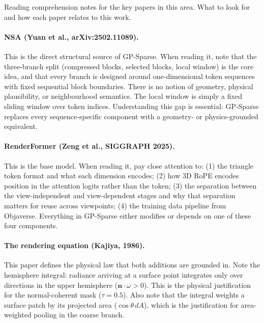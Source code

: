 \documentclass[11pt,letterpaper]{article}
\begin{document}
\begin{mdframed}[linecolor=black!30, backgroundcolor=gray!5]
Reading comprehension notes for the key papers in this area.
What to look for and how each paper relates to this work.
\end{mdframed}

\paragraph{NSA (Yuan et al., arXiv:2502.11089).}
This is the direct structural source of GP-Sparse.
When reading it, note that the three-branch split (compressed blocks,
selected blocks, local window) is the core idea, and that every branch
is designed around one-dimensional token sequences with fixed sequential
block boundaries.
There is no notion of geometry, physical plausibility, or neighbourhood
semantics.
The local window is simply a fixed sliding window over token indices.
Understanding this gap is essential: GP-Sparse replaces every
sequence-specific component with a geometry- or physics-grounded
equivalent.

\paragraph{RenderFormer (Zeng et al., SIGGRAPH 2025).}
This is the base model.
When reading it, pay close attention to: (1) the triangle token format
and what each dimension encodes; (2) how 3D RoPE encodes position in
the attention logits rather than the token; (3) the separation between
the view-independent and view-dependent stages and why that separation
matters for reuse across viewpoints; (4) the training data pipeline
from Objaverse.
Everything in GP-Sparse either modifies or depends on one of these four
components.

\paragraph{The rendering equation (Kajiya, 1986).}
This paper defines the physical law that both additions are grounded in.
Note the hemisphere integral: radiance arriving at a surface point
integrates only over directions in the upper hemisphere
($\mathbf{n} \cdot \omega > 0$).
This is the physical justification for the normal-coherent mask
($\tau = 0.5$).
Also note that the integral weights a surface patch by its projected
area ($\cos\theta \, dA$), which is the justification for area-weighted
pooling in the coarse branch.
\end{document}
